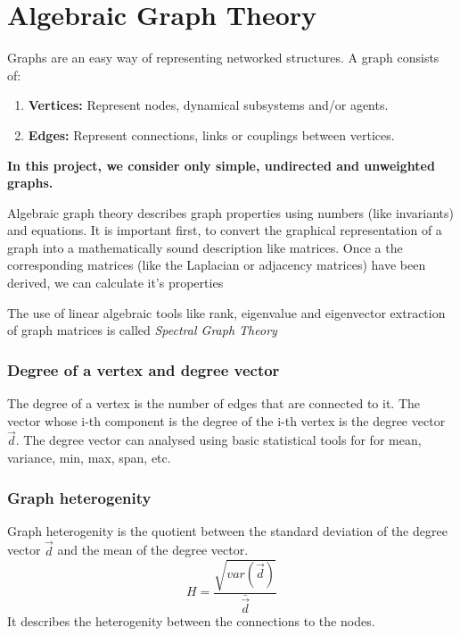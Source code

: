 \documentclass[a4paper,twoside, openright,12pt]{report}
\begin{document}

\section{Algebraic Graph Theory}

Graphs are an easy way of representing networked structures. A graph consists of: 
\begin{enumerate}
\item \textbf{Vertices:} Represent nodes, dynamical subsystems and/or agents.
\item \textbf{Edges:} Represent connections, links or couplings between vertices.
\end{enumerate}

\textbf{In this project, we consider only simple, undirected and unweighted graphs.} \linebreak

Algebraic graph theory describes graph properties using numbers (like invariants) and equations.
It is important first, to convert the graphical representation of a graph into a mathematically sound description like
matrices. Once a the corresponding matrices (like the Laplacian or adjacency matrices) have been derived, we can calculate it's properties \cite{NCS} 

The use of linear algebraic tools like rank, eigenvalue and eigenvector extraction of graph matrices is called \textit{Spectral Graph Theory} 

\subsubsection{Degree of a vertex and degree vector}
The degree of a vertex is the number of edges that are connected to it.
The vector whose i-th component is the degree of the i-th vertex is the degree vector $\vec{d}$. 
The degree vector can analysed using basic statistical tools for for mean, variance, min, max, span, etc.

\subsubsection{Graph heterogenity}
Graph heterogenity is the quotient between the standard deviation of the degree vector $\vec{d}$ and the mean of the degree vector.
\begin{equation}
 H = \frac{\sqrt{ var(\vec{d}) }}{\bar{\vec{d}}} 
\end{equation}
It describes the heterogenity between the connections to the nodes.   
\end{document}
